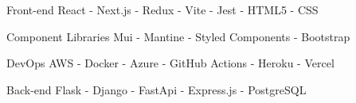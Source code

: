 

\begin{cvskills}
    
  \cvskill
    {Front-end} %
    {React - Next.js - Redux - Vite - Jest - HTML5 - CSS} %

\cvskill
  {Component Libraries} %
  {Mui - Mantine - Styled Components - Bootstrap} %
    
  \cvskill
    {DevOps} %
    {AWS - Docker - Azure - GitHub Actions - Heroku - Vercel} %

  \cvskill
    {Back-end} %
    {Flask - Django - FastApi - Express.js -  PostgreSQL} %


\end{cvskills}
